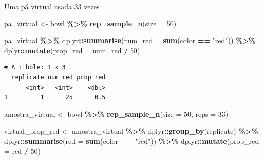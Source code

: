 \documentclass[
  9pt,
  ignorenonframetext,
  aspectratio=169]{beamer}
\newenvironment{Shaded}{\begin{snugshade}}{\end{snugshade}}
\newcommand{\DataTypeTok}[1]{\textcolor[rgb]{0.13,0.29,0.53}{#1}}
\newcommand{\DecValTok}[1]{\textcolor[rgb]{0.00,0.00,0.81}{#1}}
\newcommand{\KeywordTok}[1]{\textcolor[rgb]{0.13,0.29,0.53}{\textbf{#1}}}
\newcommand{\NormalTok}[1]{#1}
\newcommand{\OperatorTok}[1]{\textcolor[rgb]{0.81,0.36,0.00}{\textbf{#1}}}
\newcommand{\StringTok}[1]{\textcolor[rgb]{0.31,0.60,0.02}{#1}}
\begin{document}
\begin{frame}[fragile]{Uma pá virtual usada 33 vezes}
\protect\hypertarget{uma-puxe1-virtual-usada-33-vezes}{}
\begin{Shaded}
\begin{Highlighting}[]
\NormalTok{pa\_virtual \textless{}{-}}\StringTok{ }\NormalTok{bowl }\OperatorTok{\%\textgreater{}\%}\StringTok{ }
\StringTok{  }\KeywordTok{rep\_sample\_n}\NormalTok{(}\DataTypeTok{size =} \DecValTok{50}\NormalTok{)}

\NormalTok{pa\_virtual }\OperatorTok{\%\textgreater{}\%}\StringTok{ }
\StringTok{  }\NormalTok{dplyr}\OperatorTok{::}\KeywordTok{summarise}\NormalTok{(}\DataTypeTok{num\_red =} \KeywordTok{sum}\NormalTok{(color }\OperatorTok{==}\StringTok{ "red"}\NormalTok{)) }\OperatorTok{\%\textgreater{}\%}\StringTok{ }
\StringTok{  }\NormalTok{dplyr}\OperatorTok{::}\KeywordTok{mutate}\NormalTok{(}\DataTypeTok{prop\_red =}\NormalTok{ num\_red }\OperatorTok{/}\StringTok{ }\DecValTok{50}\NormalTok{)}
\end{Highlighting}
\end{Shaded}

\begin{verbatim}
# A tibble: 1 x 3
  replicate num_red prop_red
      <int>   <int>    <dbl>
1         1      25      0.5
\end{verbatim}

\begin{Shaded}
\begin{Highlighting}[]
\NormalTok{amostra\_virtual \textless{}{-}}\StringTok{ }\NormalTok{bowl }\OperatorTok{\%\textgreater{}\%}\StringTok{ }
\StringTok{  }\KeywordTok{rep\_sample\_n}\NormalTok{(}\DataTypeTok{size =} \DecValTok{50}\NormalTok{, }\DataTypeTok{reps =} \DecValTok{33}\NormalTok{)}

\NormalTok{virtual\_prop\_red \textless{}{-}}\StringTok{ }\NormalTok{amostra\_virtual }\OperatorTok{\%\textgreater{}\%}\StringTok{ }
\StringTok{  }\NormalTok{dplyr}\OperatorTok{::}\KeywordTok{group\_by}\NormalTok{(replicate) }\OperatorTok{\%\textgreater{}\%}\StringTok{ }
\StringTok{  }\NormalTok{dplyr}\OperatorTok{::}\KeywordTok{summarise}\NormalTok{(}\DataTypeTok{red =} \KeywordTok{sum}\NormalTok{(color }\OperatorTok{==}\StringTok{ "red"}\NormalTok{)) }\OperatorTok{\%\textgreater{}\%}\StringTok{ }
\StringTok{  }\NormalTok{dplyr}\OperatorTok{::}\KeywordTok{mutate}\NormalTok{(}\DataTypeTok{prop\_red =}\NormalTok{ red }\OperatorTok{/}\StringTok{ }\DecValTok{50}\NormalTok{)}
\end{Highlighting}
\end{Shaded}
\end{frame}
\end{document}

